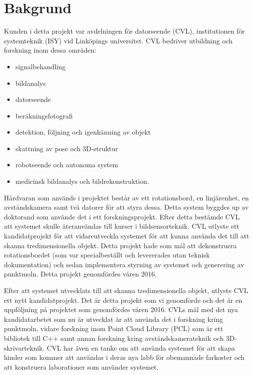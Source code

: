 \chapter{Bakgrund}
\label{cha:background}


Kunden i detta projekt var avdelningen för datorseende (CVL), institutionen för systemteknik (ISY) vid Linköpings universitet. CVL bedriver utbildning och forskning inom dessa områden:
\begin{itemize}
\item signalbehandling
\item bildanalys
\item datorseende
\item beräkningsfotografi
\item detektion, följning och igenkänning av objekt
\item skattning av pose och 3D-struktur
\item robotseende och autonoma system
\item medicinsk bildanalys och bildrekonstruktion.
\end{itemize}
 
Hårdvaran som används i projektet består av ett rotationsbord, en linjärenhet, en avståndskamera samt två datorer för att styra dessa. Detta system byggdes up av doktorand som använde det i ett forskningsprojekt. Efter detta bestämde CVL att systemet skulle återanvändas till kurser i bildsensorteknik. CVL utlyste ett kandidatprojekt för att vidareutveckla systemet för att kunna använda det till att skanna tredimensionella objekt. Detta projekt hade som mål att dekonstruera rotationsbordet (som var specialbeställt och levererades utan teknisk dokumentation) och sedan implementera styrning av systemet och generering av punktmoln. Detta projekt genomfördes våren 2016.

Efter att systemet utvecklats till att skanna tredimensionella objekt, utlyste CVL ett nytt kandidatprojekt. Det är detta projekt som vi genomförde och det är en uppföljning på projektet som genomfördes våren 2016. CVLs mål med det nya kandidatarbetet som nu är utvecklat är att använda det i forskning kring punktmoln, vidare forskning inom Point Cloud Library (PCL) som är ett bibliotek till C++ samt annan forskning kring avståndskamerateknik och 3D-skrivarteknik. CVL har även en tanke om att använda systemet för att skapa hinder som kommer att användas i deras nya labb för obemannade farkoster och att konstruera laborationer som använder systemet.

